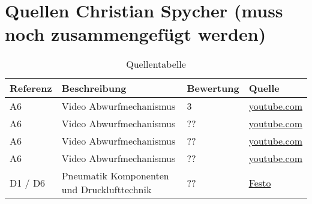 \section{Quellen Christian Spycher (muss noch zusammengefügt werden)}

\begin{table}[h!]
	\centering
	\begin{tabular}{l l l l}
		Referenz & Beschreibung & Bewertung & Quelle \\
		\hline
        
        A6 & Video Abwurfmechanismus & 3 & \href{http://www.youtube.com/watch?v=ehrB93rbLoM}{youtube.com} \\
        
         A6 & Video Abwurfmechanismus & ?? & \href{http://www.youtube.com/watch?v=Za3fQ1TSFrY}{youtube.com} \\
         
          A6 & Video Abwurfmechanismus & ?? & \href{http://www.youtube.com/watch?v=MSjCmDsDnNU}{youtube.com} \\
          
          A6 & Video Abwurfmechanismus & ?? & \href{http://www.youtube.com/watch?v=oZjx7F1doGs}{youtube.com} \\
          
          D1 / D6 & Pneumatik Komponenten und Drucklufttechnik & ?? & \href{http://www.festo.com/net/startpage/}{Festo} \\
          
          
        
        
        
	\end{tabular}
	\caption{Quellentabelle}
	\label{tab:quelle}
\end{table}
